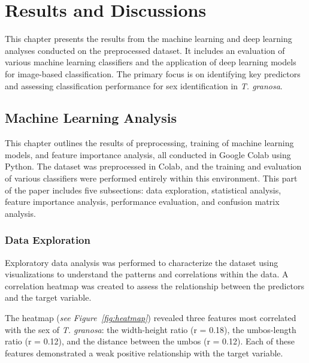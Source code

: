 
\chapter{Results and Discussions}
This chapter presents the results from the machine learning and deep learning analyses conducted on the preprocessed dataset. It includes an evaluation of various machine learning classifiers and the application of deep learning models for image-based classification. The primary focus is on identifying key predictors and assessing classification performance for sex identification in \textit{T. granosa}.

\section{Machine Learning Analysis}

This chapter outlines the results of preprocessing, training of machine learning models, and feature importance analysis, all conducted in Google Colab using Python. The dataset was preprocessed in Colab, and the training and evaluation of various classifiers were performed entirely within this environment.  This part of the paper includes five subsections: data exploration, statistical analysis, feature importance analysis, performance evaluation, and confusion matrix analysis.

\subsection{Data Exploration}

Exploratory data analysis was performed to characterize the dataset using visualizations to understand the patterns and correlations within the data. A correlation heatmap was created to assess the relationship between the predictors and the target variable.

The heatmap (\textit{see Figure~\ref{fig:heatmap}}) revealed three features most correlated with the sex of \textit{T. granosa}: the width-height ratio (r = 0.18), the umbos-length ratio (r = 0.12), and the distance between the umbos (r = 0.12). Each of these features demonstrated a weak positive relationship with the target variable. 

